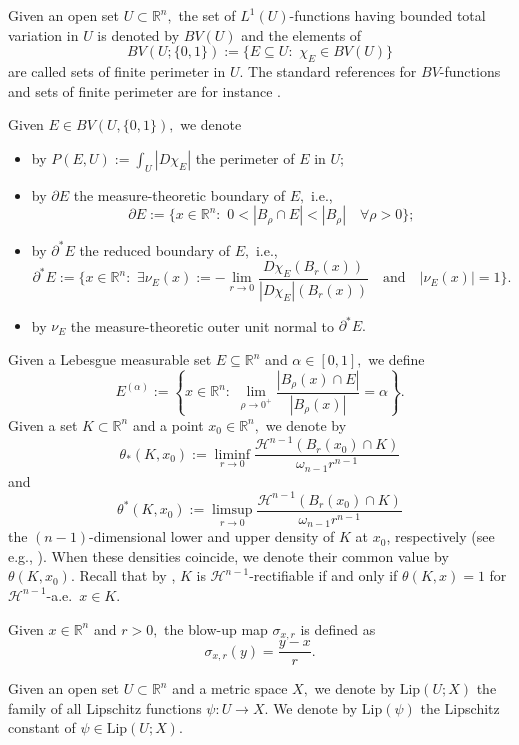 \documentclass[reqno]{amsart}
\numberwithin{equation}{section}
\theoremstyle{plain}
\theoremstyle{definition}
\newcommand{\R}{\mathbb{R}}
\newcommand{\cH}{\mathcal{H}}
\newcommand{\p}{\partial}
\newcommand{\Lip}{\mathrm{Lip}}
\begin{document}
Given an open set $U\subset\R^n,$ the set of $L^1(U)$-functions having bounded total variation in $U$ is denoted by  $BV(U)$ and the elements of 
$$
BV(U;\{0,1\}):=\{E\subseteq U:\,\, \chi_E\in BV(U)\}
$$
are called sets of finite perimeter in $U$. The standard references for $BV$-functions and sets of finite perimeter are for instance \cite{AFP:2000,Gi:1984,Maggi:2012}.

Given $E\in BV(U,\{0,1\}),$ we denote
\begin{itemize}
\item[--] by $P(E,U):=\int_U|D\chi_E|$ the perimeter of $E$ in $U;$

\item[--] by $\p E$ the measure-theoretic boundary of $E,$ i.e., 
$$
\p E:=\{x\in \R^n:\,\, 0<|B_\rho\cap E|<|B_\rho|\quad\forall \rho>0\};
$$
\item[--] by $\p^*E$ the reduced boundary of $E,$ i.e.,  
$$
\p^*E:=\Big\{x\in\R^n:\,\, \exists \nu_E(x):=-\lim\limits_{r\to0}
\frac{D\chi_E(B_r(x))}{|D\chi_E|(B_r(x))}\quad \text{and} \quad |\nu_E(x)|=1\Big\}. 
$$ 
\item[--] by $\nu_E$   the measure-theoretic outer  unit normal to $\p^* E.$
\end{itemize}
%
Given a Lebesgue measurable set $E\subseteq\R^n$ and $\alpha\in [0,1],$ we define
$$
E^{(\alpha)}:=\left\{x\in\R^n:\,\,\lim\limits_{\rho\to0^+}
\frac{|B_\rho(x)\cap E|}{|B_\rho(x)|} =\alpha\right\}.
$$
%
Given a set $K\subset\R^n$ and a point $x_0\in \R^n,$ we denote by 
$$
\theta_*(K,x_0):= \liminf\limits_{r\to0} \frac{\cH^{n-1}(B_r(x_0) \cap K)}{ \omega_{n-1}r^{n-1}}
$$
and
$$
\theta^*(K,x_0):= \limsup\limits_{r\to0} \frac{\cH^{n-1}(B_r(x_0) \cap K)}{ \omega_{n-1} r^{n-1}}
$$ 
the $(n-1)$-dimensional lower and upper density of $K$ at $x_0$,  respectively (see e.g., \cite[page 78]{AFP:2000}).  When these  densities coincide, we denote their common value by $\theta(K,x_0)$. Recall that by \cite[Theorem 2.63]{AFP:2000}, $K$ is $\cH^{n-1}$-rectifiable if and only if $\theta(K,x)=1$ for $\cH^{n-1}$-a.e.\ $x\in K.$
 

Given $x\in\R^n$ and $r>0,$ the blow-up map $\sigma_{x,r}$ is defined as
%
\begin{equation}\label{blow_ups}
\sigma_{x,r} (y)= \frac{y-x}{r}. 
\end{equation}
% 

Given an open set $U\subset\R^n$ and a metric space $X,$ we denote by $\Lip(U;X)$ the family of all Lipschitz functions $\psi:U\to X.$ We denote by $\Lip(\psi)$ the Lipschitz constant of $\psi\in \Lip(U;X).$
%
\end{document}
